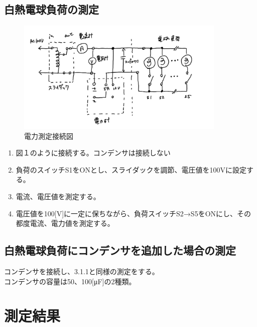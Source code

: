 \documentclass[titlepage]{jarticle}
\begin{document}
\subsection{白熱電球負荷の測定}
\begin{figure}[H]
    \begin{center}
        \includegraphics[width=10cm]{image/1.jpg}
        \caption{電力測定接続図}
    \end{center}
\end{figure}
\begin{enumerate}
    \item 図１のように接続する。コンデンサは接続しない
    \item 負荷のスイッチS1をONとし、スライダックを調節、電圧値を100Vに設定する。
    \item 電流、電圧値を測定する。
    \item 電圧値を100[V]に一定に保ちながら、負荷スイッチS2→S5をONにし、その都度電流、電力値を測定する。
\end{enumerate}


\subsection{白熱電球負荷にコンデンサを追加した場合の測定}
コンデンサを接続し、3.1.1と同様の測定をする。\\
コンデンサの容量は50、100[μF]の2種類。

\section{測定結果}
\end{document}
